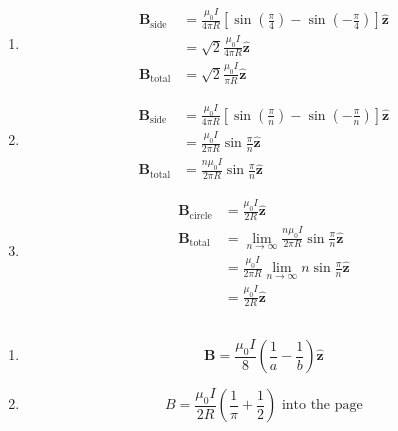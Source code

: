 \documentclass{article}
\renewcommand{\vec}[1]{\boldsymbol{\mathbf{#1}}}
\newcommand{\uvec}[1]{\hat{\vec{#1}}}
\begin{document}
\begin{enumerate}
  \item

        \begin{align*}
          \vec{B}_\text{side}  & = \frac{\mu_0 I}{4 \pi R} \left[ \sin \left( \frac{\pi}{4} \right) - \sin \left( -\frac{\pi}{4} \right) \right] \uvec{z} \\
                               & = \sqrt{2} \frac{\mu_0 I}{4 \pi R} \uvec{z}                                                                              \\
          \vec{B}_\text{total} & = \sqrt{2} \frac{\mu_0 I}{\pi R} \uvec{z}
        \end{align*}

  \item

        \begin{align*}
          \vec{B}_\text{side}  & = \frac{\mu_0 I}{4 \pi R} \left[ \sin \left( \frac{\pi}{n} \right) - \sin \left( -\frac{\pi}{n} \right) \right] \uvec{z} \\
                               & = \frac{\mu_0 I}{2 \pi R} \sin \frac{\pi}{n} \uvec{z}                                                                    \\
          \vec{B}_\text{total} & = \frac{n \mu_0 I}{2 \pi R} \sin \frac{\pi}{n} \uvec{z}
        \end{align*}

  \item

        \begin{align*}
          \vec{B}_\text{circle} & = \frac{\mu_0 I}{2 R} \uvec{z}                                                      \\
          \vec{B}_\text{total}  & = \lim_{n \rightarrow \infty} \frac{n \mu_0 I}{2 \pi R} \sin \frac{\pi}{n} \uvec{z} \\
                                & = \frac{\mu_0 I}{2 \pi R} \lim_{n \rightarrow \infty} n \sin \frac{\pi}{n} \uvec{z} \\
                                & = \frac{\mu_0 I}{2 R} \uvec{z}
        \end{align*}
\end{enumerate}

\subsection{}

\begin{enumerate}
  \item \[\vec{B} = \frac{\mu_0 I}{8} \left( \frac{1}{a} - \frac{1}{b} \right) \uvec{z}\]

  \item \[B = \frac{\mu_0 I}{2 R} \left( \frac{1}{\pi} + \frac{1}{2} \right) \text{ into the page}\]
\end{enumerate}
\end{document}
